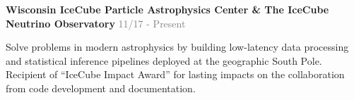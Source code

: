 
\vspace{-0.2cm}

\begin{cventries}
\vspace{-0.01cm}
  \cventry
    {} %
    {\textbf{Wisconsin IceCube Particle Astrophysics Center \& The IceCube Neutrino Observatory}} %
    {\textcolor{gray}{\scriptsize 11/17 - Present}} %
    {} %
    {
      \begin{cvitems} %
      \vspace{-0.5cm}
        \item {Solve problems in modern astrophysics by building low-latency data processing and statistical inference pipelines deployed at the geographic South Pole. Recipient of ``IceCube Impact Award'' for lasting impacts on the collaboration from code development and documentation.}
      \end{cvitems}
    }
\end{cventries}

\vspace{-0.3cm}

